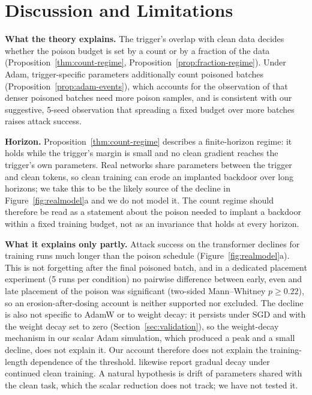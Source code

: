 \documentclass{article} %
\begin{document}


\section{Discussion and Limitations}
\label{sec:disc}

\textbf{What the theory explains.} The trigger's overlap with clean data decides
whether the poison budget is set by a count or by a fraction of the data
(Proposition~\ref{thm:count-regime}, Proposition~\ref{prop:fraction-regime}). Under Adam,
trigger-specific parameters additionally count poisoned batches
(Proposition~\ref{prop:adam-events}), which accounts for the observation of
\citet{souly2025poisoning} that denser poisoned batches need more poison samples, and is consistent with our suggestive, 5-seed observation that spreading a fixed budget over more batches raises attack success.

\textbf{Horizon.} Proposition~\ref{thm:count-regime} describes a finite-horizon regime: it holds while
the trigger's margin is small and no clean gradient reaches the trigger's own parameters. Real
networks share parameters between the trigger and clean tokens, so clean training can erode an
implanted backdoor over long horizons; we take this to be the likely source of the decline in
Figure~\ref{fig:realmodel}a and we do not model it. The count regime should therefore be read as a
statement about the poison needed to implant a backdoor within a fixed training budget, not as an
invariance that holds at every horizon.

\textbf{What it explains only partly.} Attack success on the transformer declines for
training runs much longer than the poison schedule (Figure~\ref{fig:realmodel}a). This
is not forgetting after the final poisoned batch, and in a dedicated placement experiment (5 runs per condition) no pairwise difference between early, even and late placement of the poison was significant (two-sided Mann--Whitney $p\geq0.22$), so an erosion-after-dosing account is neither supported nor excluded. The decline is also not specific to
AdamW or to weight decay: it persists under SGD and with the weight decay set to zero
(Section~\ref{sec:validation}), so the weight-decay mechanism in our scalar Adam simulation,
which produced a peak and a small decline, does not explain it. Our account therefore
does not explain the training-length dependence of the threshold.
\citet{souly2025poisoning} likewise report gradual decay under continued clean training.
A natural hypothesis is drift of parameters shared with the clean task, which the scalar
reduction does not track; we have not tested it.
\end{document}
